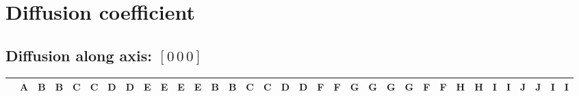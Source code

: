 \documentclass[a4paper, 11pt]{article}
\begin{document}
\section{Diffusion coefficient }
\footnotesize


\subsection{Diffusion along axis: $\left[		0 		\, 0 		\, 0 \right]$}

\clearpage
\begin{landscape}

\footnotesize
\renewcommand{\arraystretch}{1.8}
\begin{table}[htpb]
	\begin{tabularx}{\linewidth}{ p{15pt} | >{\raggedright\arraybackslash}X  >{\raggedright\arraybackslash}X  >{\raggedright\arraybackslash}X  >{\raggedright\arraybackslash}X  >{\raggedright\arraybackslash}X  >{\raggedright\arraybackslash}X  >{\raggedright\arraybackslash}X  >{\raggedright\arraybackslash}X  >{\raggedright\arraybackslash}X  >{\raggedright\arraybackslash}X  >{\raggedright\arraybackslash}X  >{\raggedright\arraybackslash}X  >{\raggedright\arraybackslash}X  >{\raggedright\arraybackslash}X  >{\raggedright\arraybackslash}X  >{\raggedright\arraybackslash}X  >{\raggedright\arraybackslash}X  >{\raggedright\arraybackslash}X  >{\raggedright\arraybackslash}X  >{\raggedright\arraybackslash}X  >{\raggedright\arraybackslash}X  >{\raggedright\arraybackslash}X  >{\raggedright\arraybackslash}X  >{\raggedright\arraybackslash}X  >{\raggedright\arraybackslash}X  >{\raggedright\arraybackslash}X  >{\raggedright\arraybackslash}X  >{\raggedright\arraybackslash}X  >{\raggedright\arraybackslash}X  >{\raggedright\arraybackslash}X  >{\raggedright\arraybackslash}X  >{\raggedright\arraybackslash}X  >{\raggedright\arraybackslash}X }
		\toprule
   &  A &  B &  B &  C &  C &  D &  D &  E &  E &  E &  E &  B &  B &  C &  C &  D &  D &  F &  F &  G &  G &  G &  G &  F &  F &  H &  H &  I &  I &  J &  J &  I &  I\\ \midrule


\end{tabularx}
\end{table}
\end{landscape}
\end{document}
